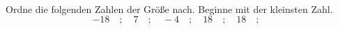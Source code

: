 \begin{aufgabe} ~ \\ 
Ordne die folgenden Zahlen der Gr\"o\ss{}e nach. Beginne mit der kleinsten Zahl.\[-18\quad ; \quad7\quad ; \quad-4\quad ; \quad18\quad ; \quad18\quad ; \quad\]\end{aufgabe} 
